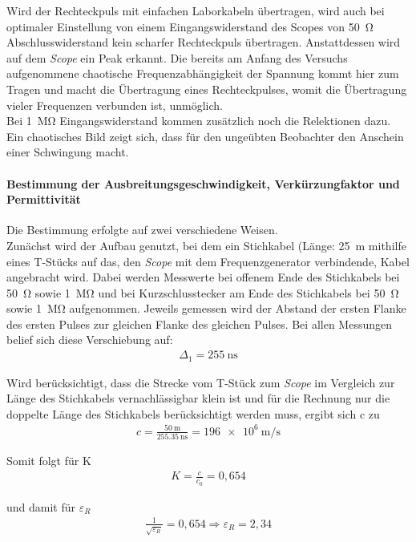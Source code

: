 \documentclass[a4paper,twoside,final]{article}
\begin{document}
Wird der Rechteckpuls mit einfachen Laborkabeln übertragen, wird auch bei optimaler Einstellung von einem Eingangswiderstand des Scopes von \SI{50}{\ohm} Abschlusswiderstand kein scharfer Rechteckpuls übertragen. Anstattdessen wird auf dem \textit{Scope} ein Peak erkannt. Die bereits am Anfang des Versuchs aufgenommene chaotische Frequenzabhängigkeit der Spannung kommt hier zum Tragen und macht die Übertragung eines Rechteckpulses, womit die Übertragung vieler Frequenzen verbunden ist, unmöglich. \\
Bei \SI{1}{\mega\ohm} Eingangswiderstand kommen zusätzlich noch die Relektionen dazu. Ein chaotisches Bild zeigt sich, dass für den ungeübten Beobachter den Anschein einer Schwingung macht.
\newpage
\paragraph{Bestimmung der Ausbreitungsgeschwindigkeit, Verkürzungfaktor und Permittivität}
Die Bestimmung erfolgte auf zwei verschiedene Weisen. \\
Zunächst wird der Aufbau genutzt, bei dem ein Stichkabel (Länge: \SI{25}{\metre} mithilfe eines T-Stücks auf das, den \textit{Scope} mit dem Frequenzgenerator verbindende, Kabel angebracht wird. Dabei werden Messwerte bei offenem Ende des Stichkabels bei \SI{50}{\ohm} sowie \SI{1}{\mega\ohm} und bei Kurzschlusstecker am Ende des Stichkabels bei \SI{50}{\ohm} sowie \SI{1}{\mega\ohm} aufgenommen. Jeweils gemessen wird der Abstand der ersten Flanke des ersten Pulses zur gleichen Flanke des gleichen Pulses. Bei allen Messungen belief sich diese Verschiebung auf:
\begin{align}
\Delta_1 = \SI{255}{\nano\second}
\end{align}

Wird berücksichtigt, dass die Strecke vom T-Stück zum \textit{Scope} im Vergleich zur Länge des Stichkabels vernachlässigbar klein ist und für die Rechnung nur die doppelte Länge des Stichkabels berücksichtigt werden muss, ergibt sich c zu
\begin{align}
c = \frac{\SI{50}{\metre}}{\SI{255,35}{\nano\second}} = \SI{196e6}{\metre\per\second}
\end{align}

Somit folgt für K
\begin{align}
K = \frac{c}{c_0} = 0,654
\end{align}

und damit für $\varepsilon_R$
\begin{align}
\frac{1}{\sqrt{\varepsilon_R}} = 0,654 \Rightarrow \varepsilon_R = 2,34
\end{align}
\end{document}
